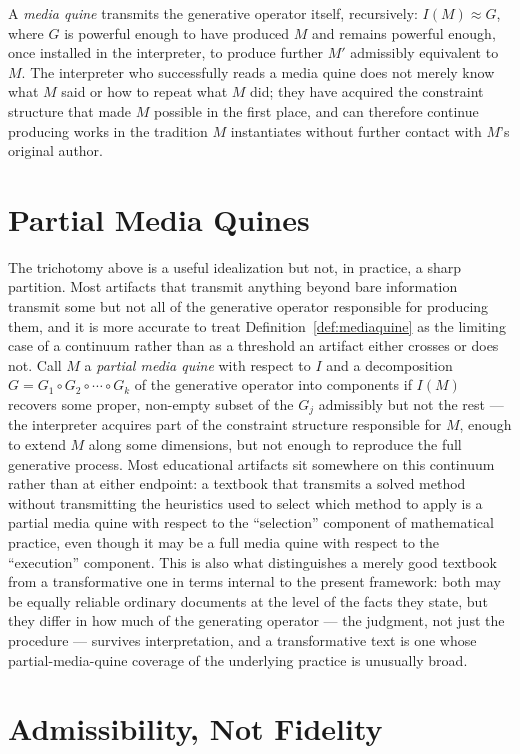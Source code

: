 \documentclass[11pt]{book}
\begin{document}
A \emph{media quine} transmits the generative operator itself, recursively: $I(M) \approx G$, where $G$ is powerful enough to have produced $M$ and remains powerful enough, once installed in the interpreter, to produce further $M'$ admissibly equivalent to $M$. The interpreter who successfully reads a media quine does not merely know what $M$ said or how to repeat what $M$ did; they have acquired the constraint structure that made $M$ possible in the first place, and can therefore continue producing works in the tradition $M$ instantiates without further contact with $M$'s original author.

\section{Partial Media Quines}

The trichotomy above is a useful idealization but not, in practice, a sharp partition. Most artifacts that transmit anything beyond bare information transmit some but not all of the generative operator responsible for producing them, and it is more accurate to treat Definition~\ref{def:mediaquine} as the limiting case of a continuum rather than as a threshold an artifact either crosses or does not. Call $M$ a \emph{partial media quine} with respect to $I$ and a decomposition $G = G_1 \circ G_2 \circ \cdots \circ G_k$ of the generative operator into components if $I(M)$ recovers some proper, non-empty subset of the $G_j$ admissibly but not the rest --- the interpreter acquires part of the constraint structure responsible for $M$, enough to extend $M$ along some dimensions, but not enough to reproduce the full generative process. Most educational artifacts sit somewhere on this continuum rather than at either endpoint: a textbook that transmits a solved method without transmitting the heuristics used to select which method to apply is a partial media quine with respect to the ``selection'' component of mathematical practice, even though it may be a full media quine with respect to the ``execution'' component. This is also what distinguishes a merely good textbook from a transformative one in terms internal to the present framework: both may be equally reliable ordinary documents at the level of the facts they state, but they differ in how much of the generating operator --- the judgment, not just the procedure --- survives interpretation, and a transformative text is one whose partial-media-quine coverage of the underlying practice is unusually broad.

\section{Admissibility, Not Fidelity}
\end{document}
